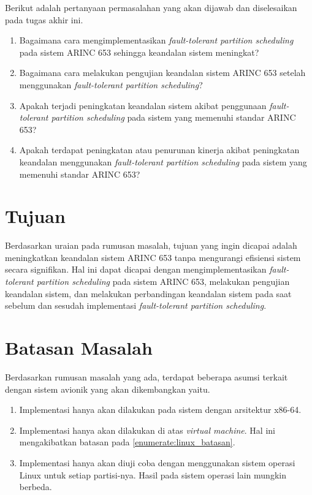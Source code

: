Berikut adalah pertanyaan permasalahan yang akan dijawab dan diselesaikan pada tugas akhir ini.

\begin{enumerate}

    \item Bagaimana cara mengimplementasikan \textit{fault-tolerant partition scheduling} pada
    	    sistem ARINC 653 sehingga keandalan sistem meningkat?

    \item Bagaimana cara melakukan pengujian keandalan sistem ARINC 653 setelah menggunakan
    	    \textit{fault-tolerant partition scheduling}?

    \item Apakah terjadi peningkatan keandalan sistem akibat penggunaan \textit{fault-tolerant
    	    partition scheduling} pada sistem yang memenuhi standar ARINC 653?

    \item Apakah terdapat peningkatan atau penurunan kinerja akibat peningkatan keandalan
    	    menggunakan \textit{fault-tolerant partition scheduling} pada sistem yang memenuhi
    	    standar ARINC 653?

\end{enumerate}

\section{Tujuan}
\label{section:tujuan}

Berdasarkan uraian pada rumusan masalah, tujuan yang ingin dicapai adalah meningkatkan keandalan
sistem ARINC 653 tanpa mengurangi efisiensi sistem secara signifikan. Hal ini dapat dicapai
dengan mengimplementasikan \textit{fault-tolerant partition scheduling} pada sistem ARINC 653,
melakukan pengujian keandalan sistem, dan melakukan perbandingan keandalan sistem pada saat
sebelum dan sesudah implementasi \textit{fault-tolerant partition scheduling}.

\section{Batasan Masalah}
\label{section:batasan_masalah}

Berdasarkan rumusan masalah yang ada, terdapat beberapa asumsi terkait dengan sistem avionik
yang akan dikembangkan yaitu.

\begin{enumerate}

    \item Implementasi hanya akan dilakukan pada sistem dengan arsitektur x86-64.

    \item Implementasi hanya akan dilakukan di atas \textit{virtual machine}. Hal ini
	    mengakibatkan batasan pada \autoref{enumerate:linux_batasan}.

    \item \label{enumerate:linux_batasan} Implementasi hanya akan diuji coba dengan menggunakan sistem operasi Linux untuk
	    setiap partisi-nya. Hasil pada sistem operasi lain mungkin berbeda.

\end{enumerate}

